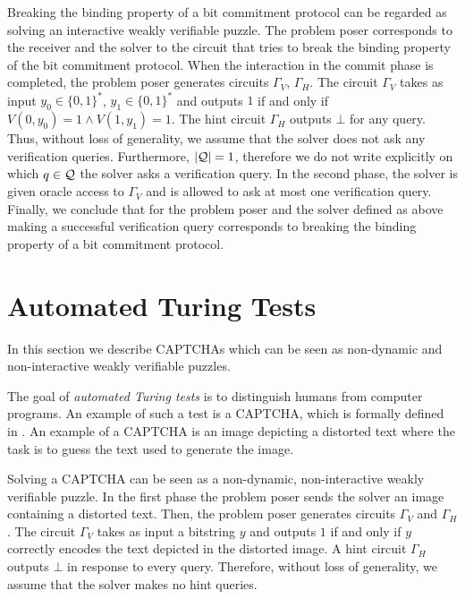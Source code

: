 Breaking the binding property of a bit commitment protocol can be regarded as solving an interactive weakly verifiable puzzle.
The problem poser corresponds to the receiver and the solver to the circuit that tries to break the binding property of the bit commitment protocol.
When the interaction in the commit phase is completed, the problem poser generates circuits $\Gamma_V$, $\Gamma_H$.
The circuit $\Gamma_V$ takes as input $y_0 \in \{0,1\}^{*}$, $y_1 \in \{0,1\}^{*}$ and outputs $1$
if and only if $V(0,y_0) = 1 \land V(1,y_1) = 1$. The hint circuit $\Gamma_H$ outputs $\bot$ for any query.
Thus, without loss of generality, we assume that the solver does not ask any verification queries.
Furthermore, $|\mathcal{Q}| = 1$, therefore we do not write explicitly on which $q \in \mathcal{Q}$ the solver asks a verification query.
In the second phase, the solver is given oracle access to $\Gamma_V$ and is allowed to ask at most one verification query.
Finally, we conclude that for the problem poser and the solver defined as above making a successful verification query
corresponds to breaking the binding property of a bit commitment protocol.

\section{Automated Turing Tests}
\label{section:att}
In this section we describe CAPTCHAs which can be seen as non-dynamic
and non-interactive weakly verifiable puzzles.

The goal of \textit{automated Turing tests} is to distinguish humans from computer programs.
An example of such a test is a CAPTCHA, which is formally defined in \cite{von2003captcha}.
An example of a CAPTCHA is an image depicting a distorted text where the task is to guess the text used to generate the image.

Solving a CAPTCHA can be seen as a non-dynamic, non-interactive weakly verifiable puzzle.
In the first phase the problem poser sends the solver an image containing a distorted text.
Then, the problem poser generates circuits $\Gamma_V$ and $\Gamma_H$.
The circuit $\Gamma_V$ takes as input a bitstring $y$ and outputs $1$
if and only if $y$ correctly encodes the text depicted in the distorted image.
A hint circuit $\Gamma_H$ outputs $\bot$ in response to every query.
Therefore, without loss of generality, we assume that the solver makes no hint queries.

